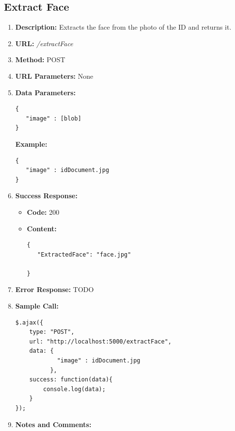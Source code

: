 \documentclass{article}
\begin{document}
\subsection{Extract Face}
\begin{enumerate}
	\item \textbf{Description:} Extracts the face from the photo of the ID and returns it.
	\item \textbf{URL:} \textit{/extractFace}
	\item \textbf{Method:} POST
	\item \textbf{URL Parameters:} None
	\item \textbf{Data Parameters:}

	\begin{lstlisting}
{
   "image" : [blob]
}
	\end{lstlisting}

	\textbf{Example:}

	\begin{lstlisting}
{
   "image" : idDocument.jpg
}
	\end{lstlisting}
	
	\item \textbf{Success Response:} 
		\begin{itemize}
			\item \textbf{Code:} 200
			\item \textbf{Content:}
			\begin{lstlisting}
{
   "ExtractedFace": "face.jpg"

}
			\end{lstlisting}
		\end{itemize}
		\item \textbf{Error Response:} TODO
		\item \textbf{Sample Call:}
		\begin{lstlisting}
$.ajax({
    type: "POST",
    url: "http://localhost:5000/extractFace",
    data: {
            "image" : idDocument.jpg
          },
    success: function(data){
        console.log(data);
    }
});
		\end{lstlisting}
		\item \textbf{Notes and Comments:}
\end{enumerate}
\end{document}
